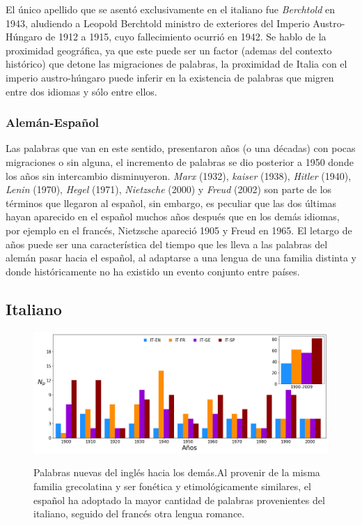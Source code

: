 El único apellido que se asentó exclusivamente en el  italiano fue \textit{Berchtold} en 1943, aludiendo a Leopold Berchtold ministro de exteriores del Imperio Austro-Húngaro de 1912 a 1915, cuyo fallecimiento ocurrió en 1942.  Se hablo de la proximidad geográfica, ya que este puede ser un factor (ademas del contexto histórico) que detone las migraciones de palabras, la proximidad de Italia con el imperio austro-húngaro puede inferir en la existencia de  palabras que migren entre  dos idiomas y sólo entre ellos. 

  
\subsubsection*{Alemán-Español}%

Las palabras que van en este sentido,  presentaron años (o una décadas)  con pocas migraciones o sin alguna, el incremento de palabras se dio posterior a 1950 donde los años sin intercambio disminuyeron.  \textit{Marx} (1932), \textit{kaiser} (1938), \textit{Hitler} (1940), \textit{Lenin} (1970), \textit{Hegel} (1971),  \textit{Nietzsche} (2000) y \textit{Freud} (2002) son parte de los términos que llegaron al español,  sin embargo, es peculiar que las dos últimas hayan aparecido en el español muchos años después que en los demás idiomas, por ejemplo en el francés,  Nietzsche apareció 1905 y Freud en 1965. El letargo de años puede ser una característica del tiempo que les lleva  a las  palabras del alemán pasar hacia el español, al adaptarse a una lengua de una familia distinta y donde históricamente no ha existido un evento conjunto entre países. 




\clearpage
\subsection{Italiano}%

\begin{figure}[h!]
	\centering
	\includegraphics[scale=.38]{Cap_3/NC_IT.png}
	\label{fig.NC_IT}
	\caption{Palabras nuevas del inglés hacia los demás.Al provenir de la misma familia grecolatina y ser fonética y etimológicamente similares, el español ha adoptado la mayor cantidad de palabras provenientes del italiano,  seguido del francés otra lengua romance.} 
\end{figure}




